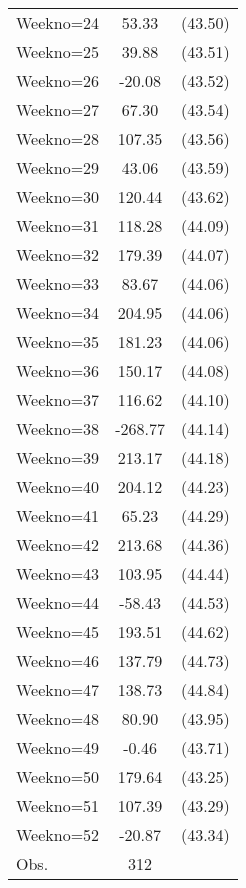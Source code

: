 {\begin{tabular}{l*{1}{cc}}
Weekno=24       &    53.33&  (43.50)\\
Weekno=25       &    39.88&  (43.51)\\
Weekno=26       &   -20.08&  (43.52)\\
Weekno=27       &    67.30&  (43.54)\\
Weekno=28       &   107.35&  (43.56)\\
Weekno=29       &    43.06&  (43.59)\\
Weekno=30       &   120.44&  (43.62)\\
Weekno=31       &   118.28&  (44.09)\\
Weekno=32       &   179.39&  (44.07)\\
Weekno=33       &    83.67&  (44.06)\\
Weekno=34       &   204.95&  (44.06)\\
Weekno=35       &   181.23&  (44.06)\\
Weekno=36       &   150.17&  (44.08)\\
Weekno=37       &   116.62&  (44.10)\\
Weekno=38       &  -268.77&  (44.14)\\
Weekno=39       &   213.17&  (44.18)\\
Weekno=40       &   204.12&  (44.23)\\
Weekno=41       &    65.23&  (44.29)\\
Weekno=42       &   213.68&  (44.36)\\
Weekno=43       &   103.95&  (44.44)\\
Weekno=44       &   -58.43&  (44.53)\\
Weekno=45       &   193.51&  (44.62)\\
Weekno=46       &   137.79&  (44.73)\\
Weekno=47       &   138.73&  (44.84)\\
Weekno=48       &    80.90&  (43.95)\\
Weekno=49       &    -0.46&  (43.71)\\
Weekno=50       &   179.64&  (43.25)\\
Weekno=51       &   107.39&  (43.29)\\
Weekno=52       &   -20.87&  (43.34)\\
\hline
Obs.            &      312&         \\
\hline\hline
\end{tabular}
}
